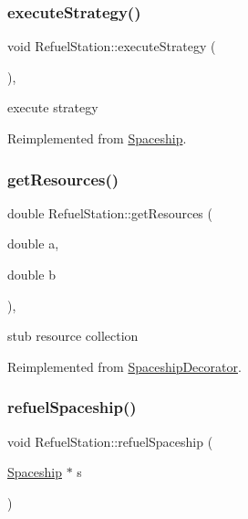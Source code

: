 \subsubsection{\texorpdfstring{execute\+Strategy()}{executeStrategy()}}
{\footnotesize\ttfamily void Refuel\+Station\+::execute\+Strategy (\begin{DoxyParamCaption}{ }\end{DoxyParamCaption})\hspace{0.3cm}{\ttfamily [inline]}, {\ttfamily [virtual]}}

execute strategy 

Reimplemented from \hyperlink{classSpaceship}{Spaceship}.

\mbox{\label{classRefuelStation_a69c7e7aca14ba70f4d2c4c11e43b4bb4}} 
\subsubsection{\texorpdfstring{get\+Resources()}{getResources()}}
{\footnotesize\ttfamily double Refuel\+Station\+::get\+Resources (\begin{DoxyParamCaption}\item[{double}]{a,  }\item[{double}]{b }\end{DoxyParamCaption})\hspace{0.3cm}{\ttfamily [inline]}, {\ttfamily [virtual]}}

stub resource collection 

Reimplemented from \hyperlink{classSpaceshipDecorator_a5ee7a9a8c146c85f08591e47d971dce7}{Spaceship\+Decorator}.

\mbox{\label{classRefuelStation_a1b14f9c75c883e3288c52a32b2bbd8a4}} 
\subsubsection{\texorpdfstring{refuel\+Spaceship()}{refuelSpaceship()}}
{\footnotesize\ttfamily void Refuel\+Station\+::refuel\+Spaceship (\begin{DoxyParamCaption}\item[{\hyperlink{classSpaceship}{Spaceship} $\ast$}]{s }\end{DoxyParamCaption})}

